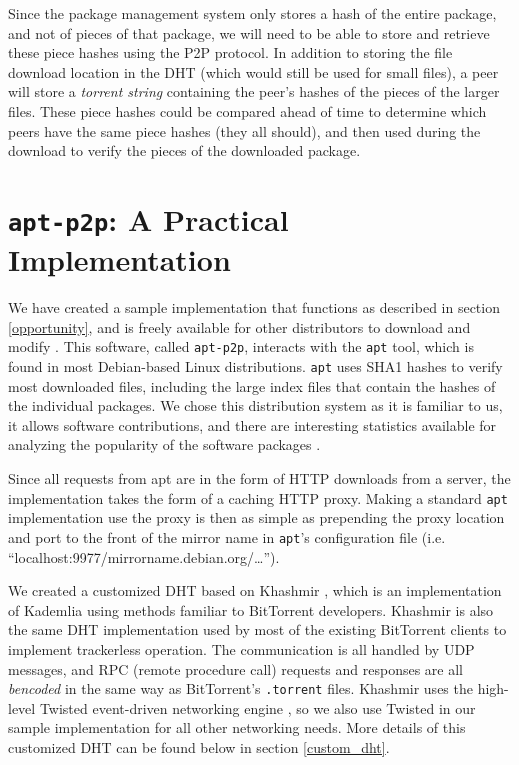 \documentclass[conference]{IEEEtran}
\begin{document}
Since the package management system only stores a hash of the entire
package, and not of pieces of that package, we will need to be able
to store and retrieve these piece hashes using the P2P protocol. In
addition to storing the file download location in the DHT (which
would still be used for small files), a peer will store a
\emph{torrent string} containing the peer's hashes of the pieces of
the larger files. These piece hashes could be compared ahead of time
to determine which peers have the same piece hashes (they all
should), and then used during the download to verify the pieces of
the downloaded package.


\section{\texttt{apt-p2p}: A Practical Implementation}
\label{implementation}

We have created a sample implementation that functions as described
in section \ref{opportunity}, and is freely available for other
distributors to download and modify \cite{apt-p2p}. This software,
called \texttt{apt-p2p}, interacts with the \texttt{apt} tool, which
is found in most Debian-based Linux distributions. \texttt{apt} uses
SHA1 hashes to verify most downloaded files, including the large
index files that contain the hashes of the individual packages. We
chose this distribution system as it is familiar to us, it allows
software contributions, and there are interesting statistics
available for analyzing the popularity of the software packages
\cite{popcon}.

Since all requests from apt are in the form of HTTP downloads from a
server, the implementation takes the form of a caching HTTP proxy.
Making a standard \texttt{apt} implementation use the proxy is then
as simple as prepending the proxy location and port to the front of
the mirror name in \texttt{apt}'s configuration file (i.e.
``localhost:9977/mirrorname.debian.org/\ldots'').

We created a customized DHT based on Khashmir \cite{khashmir}, which
is an implementation of Kademlia \cite{kademlia} using methods
familiar to BitTorrent developers. Khashmir is also the same DHT
implementation used by most of the existing BitTorrent clients to
implement trackerless operation. The communication is all handled by
UDP messages, and RPC (remote procedure call) requests and responses
are all \emph{bencoded} in the same way as BitTorrent's
\texttt{.torrent} files. Khashmir uses the high-level Twisted
event-driven networking engine \cite{twisted}, so we also use
Twisted in our sample implementation for all other networking needs.
More details of this customized DHT can be found below in section
\ref{custom_dht}.
\end{document}
